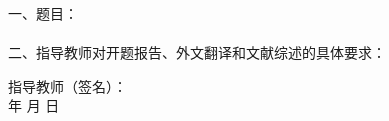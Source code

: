 
\newpage
\thispagestyle{empty}

\begin{tabbing}
\hspace{5mm}\songti\sihao 一、题目：\underline{\makebox[12cm]{\zjutitlec}}
\\ \\
\hspace{5mm}\songti\sihao 二、指导教师对开题报告、外文翻译和文献综述的具体要求：
\end{tabbing}

\vspace{140mm}

\begin{tabbing}
\hspace{80mm}\songti\xiaosi 指导教师（签名）：
\\ \hspace{90mm} \songti\xiaosi 年 \hspace{5mm} \songti\xiaosi 月 \hspace{5mm} \songti\xiaosi 日
\end{tabbing}


